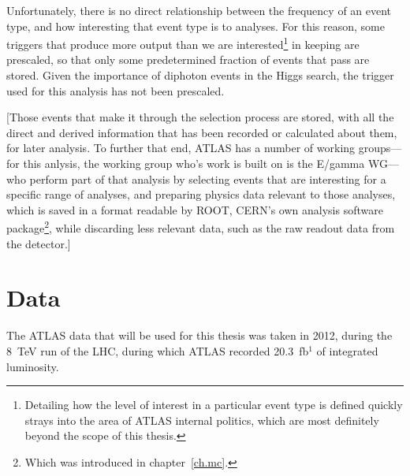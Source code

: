 \begin{english}
Unfortunately, there is no direct relationship between the frequency of an event type, and how interesting that event type is to analyses. For this reason, some triggers that produce more output than we are interested\footnote{Detailing how the level of interest in a particular event type is defined quickly strays into the area of ATLAS internal politics, which are most definitely beyond the scope of this thesis.} in keeping are prescaled, so that only some predetermined fraction of events that pass are stored. Given the importance of diphoton events in the Higgs search, the trigger used for this analysis has not been prescaled.

[Those events that make it through the selection process are stored, with all the direct and derived information that has been recorded or calculated about them, for later analysis. To further that end, ATLAS has a number of working groups---for this anlysis, the working group who's work is built on is the E/gamma WG---who perform part of that analysis by selecting events that are interesting for a specific range of analyses, and preparing physics data relevant to those analyses, which is saved in a format readable by ROOT, CERN's own analysis software package\footnote{Which was introduced in chapter~\ref{ch.mc}.}, while discarding less relevant data, such as the raw readout data from the detector.]

\chapter{Data}
The ATLAS data that will be used for this thesis was taken in 2012, during the 8~TeV run of the LHC, during which ATLAS recorded 20.3~fb$^{1}$ of integrated luminosity.


\end{english}
